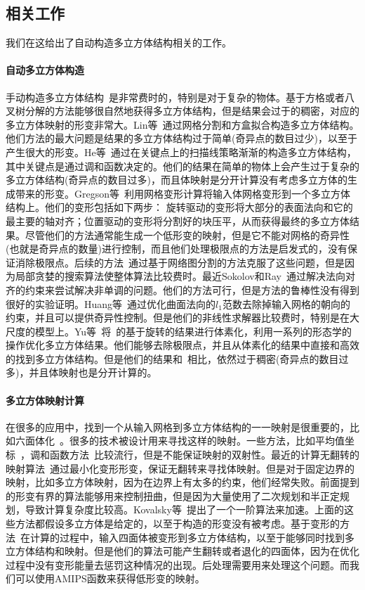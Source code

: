\subsection{相关工作}
我们在这给出了自动构造多立方体结构相关的工作。

\paragraph{自动多立方体构造}
手动构造多立方体结构~\cite{Tarini2004}是非常费时的，特别是对于复杂的物体。基于方格或者八叉树分解的方法能够很自然地获得多立方体结构，但是结果会过于的稠密，对应的多立方体映射的形变非常大。Lin等~\cite{Lin2008}通过网格分割和方盒拟合构造多立方体结构。他们方法的最大问题是结果的多立方体结构过于简单(奇异点的数目过少)，以至于产生很大的形变。He等~\cite{He2009}通过在关键点上的扫描线策略渐渐的构造多立方体结构，其中关键点是通过调和函数决定的。他们的结果在简单的物体上会产生过于复杂的多立方体结构(奇异点的数目过多)，而且体映射是分开计算没有考虑多立方体的生成带来的形变。Gregson等~\cite{Gregson2011}利用网格变形计算将输入体网格变形到一个多立方体结构上。他们的变形包括如下两步： 旋转驱动的变形将大部分的表面法向和它的最主要的轴对齐；位置驱动的变形将分割好的块压平，从而获得最终的多立方体结果。尽管他们的方法通常能生成一个低形变的映射，但是它不能对网格的奇异性(也就是奇异点的数量)进行控制，而且他们处理极限点的方法是启发式的，没有保证消除极限点。后续的方法~\cite{Livesu2013}通过基于网络图分割的方法克服了这些问题，但是因为局部贪婪的搜索算法使整体算法比较费时。最近Sokolov和Ray~\cite{Sokolov2015}通过解决法向对齐的约束来尝试解决非单调的问题。他们的方法可行，但是方法的鲁棒性没有得到很好的实验证明。Huang等~\cite{Huang2014}通过优化曲面法向的$l_1$范数去除掉输入网格的朝向的约束，并且可以提供奇异性控制。但是他们的非线性求解器比较费时，特别是在大尺度的模型上。Yu等~\cite{Yu2014}将~\cite{Gregson2011}的基于旋转的结果进行体素化，利用一系列的形态学的操作优化多立方体结果。他们能够去除极限点，并且从体素化的结果中直接和高效的找到多立方体结构。但是他们的结果和~\cite{Livesu2013,Huang2014}相比，依然过于稠密(奇异点的数目过多)，并且体映射也是分开计算的。

\paragraph{多立方体映射计算}
在很多的应用中，找到一个从输入网格到多立方体结构的一一映射是很重要的，比如六面体化~\cite{HanXiaHe2010,Gregson2011}。很多的技术被设计用来寻找这样的映射。一些方法，比如平均值坐标~\cite{Floater2003mean}，调和函数方法~\cite{LiGuoWangEtAl2007}比较流行，但是不能保证映射的双射性。最近的计算无翻转的映射算法~\cite{Schuller2013,Fu2015}通过最小化变形形变，保证无翻转来寻找体映射。但是对于固定边界的映射，比如多立方体映射，因为在边界上有太多的约束，他们经常失败。前面提到的形变有界的算法能够用来控制扭曲，但是因为大量使用了二次规划和半正定规划，导致计算复杂度比较高。Kovalsky等~\cite{Kovalsky2015}提出了一个一阶算法来加速。上面的这些方法都假设多立方体是给定的，以至于构造的形变没有被考虑。基于变形的方法~\cite{Gregson2011,Huang2014}在计算的过程中，输入四面体被变形到多立方体结构，以至于能够同时找到多立方体结构和映射。但是他们的算法可能产生翻转或者退化的四面体，因为在优化过程中没有变形能量去惩罚这种情况的出现。后处理需要用来处理这个问题。而我们可以使用AMIPS函数来获得低形变的映射。

